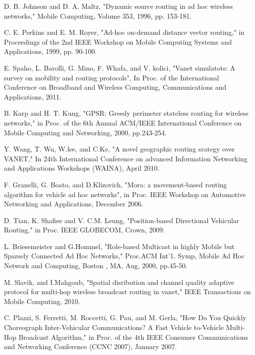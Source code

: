 \documentclass{IEEEtran}
\begin{document}
\begin{thebibliography}{1}

D. B. Johnson and D. A. Maltz, "Dynamic source routing in ad hoc
wireless networks," Mobile Computing, Volume 353, 1996, pp. 153-181.


C. E. Perkins and E. M. Royer, "Ad-hoc on-demand distance vector
routing," in Proceedings of the 2nd IEEE Workshop on Mobile
Computing Systems and Applications, 1999, pp. 90-100.


E. Spaho, L. Barolli, G. Mino, F. Whafa, and V. kolici, "Vanet
simulatots: A survey on mobility and routing protocols", In Proc. of
the International Conference on Broadband and Wireless Computing,
Communications and Applications, 2011.


B. Karp and H. T. Kung, "GPSR: Greedy perimeter stateless routing
for wireless networks," in Proc. of the 6th Annual ACM/IEEE
International Conference on Mobile Computing and Networking, 2000,
pp.243-254.

Y. Wang, T. Wu, W.lee, and C.Ke, "A novel geographic routing srategy
over VANET," In 24th International Conference on advanced
Information Networking and Applications Workshops (WAINA), April
2010.


F. Granelli, G. Boato, and D.Klizovich, "Mora: a movement-based
routing algorithm for vehicle ad hoc networks", in Proc. IEEE
Workshop on Automotive Networking and Applications, December 2006.




D. Tian, K. Shafiee and V. C.M. Leung, "Position-based Directional
Vehicular Routing," in Proc. IEEE GLOBECOM, Crown, 2009.


L.   Briesemeister and G.Hommel, "Role-based Multicast in highly
Mobile but Sparsely Connected Ad Hoc Networks," Proc.ACM Int'1.
Symp, Mobile Ad Hoc Network and Computing, Boston , MA, Aug, 2000,
pp.45-50.


M. Slavik, and I.Mahgoub, "Spatial disribution and channel quality
adaptive protocol for multi-hop wireless broadcast routing in
vanet," IEEE Transactions on Mobile Computing, 2010.

C. Plazzi, S. Ferretti, M. Roccetti, G. Pau, and M. Gerla, "How Do
You Quickly Choreograph Inter-Vehicular Communications? A Fast
Vehicle to-Vehicle Multi-Hop Broadcast Algorithm," in Proc. of the
4th IEEE Consumer Communications and Networking Conference (CCNC
2007), January 2007.





\end{thebibliography}
\end{document}
